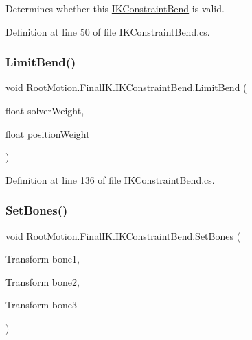 Determines whether this \mbox{\hyperlink{class_root_motion_1_1_final_i_k_1_1_i_k_constraint_bend}{I\+K\+Constraint\+Bend}} is valid. 



Definition at line 50 of file I\+K\+Constraint\+Bend.\+cs.

\mbox{\label{class_root_motion_1_1_final_i_k_1_1_i_k_constraint_bend_ab4f9040070d57243b4f0469ec04fb034}} 
\subsubsection{\texorpdfstring{Limit\+Bend()}{LimitBend()}}
{\footnotesize\ttfamily void Root\+Motion.\+Final\+I\+K.\+I\+K\+Constraint\+Bend.\+Limit\+Bend (\begin{DoxyParamCaption}\item[{float}]{solver\+Weight,  }\item[{float}]{position\+Weight }\end{DoxyParamCaption})}



Definition at line 136 of file I\+K\+Constraint\+Bend.\+cs.

\mbox{\label{class_root_motion_1_1_final_i_k_1_1_i_k_constraint_bend_ab38e28d0128cdf34a005dfe9a3f74bf9}} 
\subsubsection{\texorpdfstring{Set\+Bones()}{SetBones()}}
{\footnotesize\ttfamily void Root\+Motion.\+Final\+I\+K.\+I\+K\+Constraint\+Bend.\+Set\+Bones (\begin{DoxyParamCaption}\item[{Transform}]{bone1,  }\item[{Transform}]{bone2,  }\item[{Transform}]{bone3 }\end{DoxyParamCaption})}




